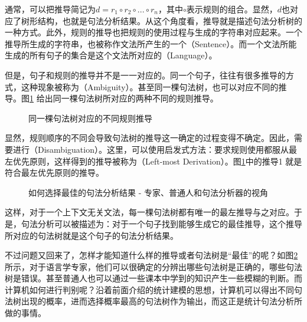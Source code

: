 \parinterval 通常，可以把推导简记为$d=r_1 \circ r_2 \circ ... \circ r_n$，其中$ \circ $表示规则的组合。显然，$d$也对应了树形结构，也就是句法分析结果。从这个角度看，推导就是描述句法分析树的一种方式。此外，规则的推导也把规则的使用过程与生成的字符串对应起来。一个推导所生成的字符串，也被称作文法所产生的一个{\small{}}（Sentence）。而一个文法所能生成的所有句子的集合是这个文法所对应的{\small{}}（Language）。

\parinterval 但是，句子和规则的推导并不是一一对应的。同一个句子，往往有很多推导的方式，这种现象被称为{\small{}}（Ambiguity）。甚至同一棵句法树，也可以对应不同的推导。图\ref{fig:2-23} 给出同一棵句法树所对应的两种不同的规则推导。

\begin{figure}[htp]
    \centering

\setlength{\abovecaptionskip}{-0.5em}
	\caption{同一棵句法树对应的不同规则推导}
    \label{fig:2-23}
\end{figure}

\parinterval 显然，规则顺序的不同会导致句法树的推导这一确定的过程变得不确定。因此，需要进行{\small{}}（Disambiguation）。这里，可以使用启发式方法：要求规则使用都服从最左优先原则，这样得到的推导被称为{\small{}}（Left-most Derivation）。图\ref{fig:2-23}中的推导1 就是符合最左优先原则的推导。

\begin{figure}[htp]
    \centering

	\caption{如何选择最佳的句法分析结果 - 专家、普通人和句法分析器的视角}
    \label{fig:2-24}
\end{figure}

\parinterval 这样，对于一个上下文无关文法，每一棵句法树都有唯一的最左推导与之对应。于是，句法分析可以被描述为：对于一个句子找到能够生成它的最佳推导，这个推导所对应的句法树就是这个句子的句法分析结果。

\parinterval 不过问题又回来了，怎样才能知道什么样的推导或者句法树是``最佳''的呢？如图\ref{fig:2-24}所示，对于语言学专家，他们可以很确定的分辨出哪些句法树是正确的，哪些句法树是错误。甚至普通人也可以通过一些课本中学到的知识产生一些模糊的判断。而计算机如何进行判别呢？沿着前面介绍的统计建模的思想，计算机可以得出不同句法树出现的概率，进而选择概率最高的句法树作为输出，而这正是统计句法分析所做的事情。

